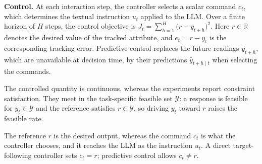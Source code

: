 \textbf{Control.}\label{sec:problem_control}
At each interaction step, the controller selects a scalar command \(c_t\), which determines the textual instruction \(u_t\) applied to the LLM. Over a finite horizon of \(H\) steps, the control objective is
\(J_t=\sum_{h=1}^{H}\bigl(r-y_{t+h}\bigr)^2\).\label{eq:control_objective}  %
Here \(r\in\mathbb{R}\) denotes the desired value of the tracked attribute, and \(e_t=r-y_t\) is the corresponding tracking error. Predictive control replaces the future readings \(y_{t+h}\), which are unavailable at decision time, by their predictions \(\widehat y_{t+h\mid t}\) when selecting the commands.

The controlled quantity is continuous, whereas the experiments report constraint satisfaction. They meet in the task-specific feasible set \(\mathcal{Y}\): a response is feasible for \(y_t\in\mathcal{Y}\) and the reference satisfies \(r\in\mathcal{Y}\), so driving \(y_t\) toward \(r\) raises the feasible rate.

The reference \(r\) is the desired output, whereas the command \(c_t\) is what the controller chooses, and it reaches the LLM as the instruction \(u_t\). A direct target-following controller sets \(c_t=r\); predictive control allows \(c_t\neq r\).
